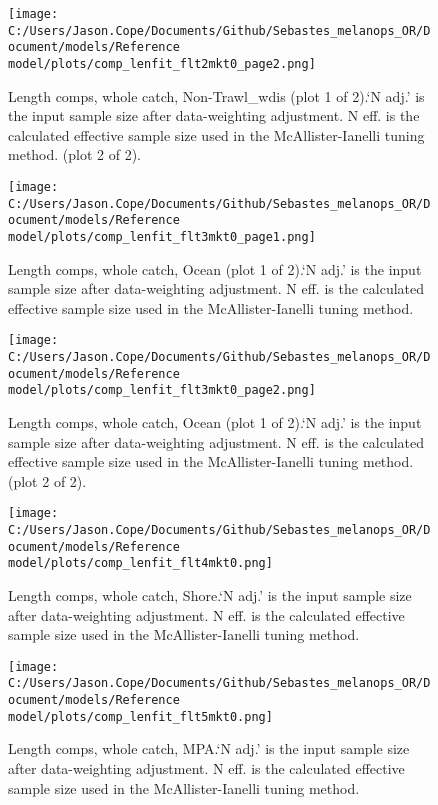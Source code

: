 \documentclass[11pt,
  english,
  letterpaper,
]{article}
\begin{document}
\begin{figure}
\centering
\texttt{[image: C:/Users/Jason.Cope/Documents/Github/Sebastes\_melanops\_OR/Document/models/Reference model/plots/comp\_lenfit\_flt2mkt0\_page2.png]}
\caption{Length comps, whole catch, Non-Trawl\_wdis (plot 1 of 2).`N adj.' is the input sample size after data-weighting adjustment. N eff. is the calculated effective sample size used in the McAllister-Ianelli tuning method. (plot 2 of 2).\label{fig:comp_lenfit_flt2mkt0_page2}}
\end{figure}

\begin{figure}
\centering
\texttt{[image: C:/Users/Jason.Cope/Documents/Github/Sebastes\_melanops\_OR/Document/models/Reference model/plots/comp\_lenfit\_flt3mkt0\_page1.png]}
\caption{Length comps, whole catch, Ocean (plot 1 of 2).`N adj.' is the input sample size after data-weighting adjustment. N eff. is the calculated effective sample size used in the McAllister-Ianelli tuning method.\label{fig:comp_lenfit_flt3mkt0_page1}}
\end{figure}

\begin{figure}
\centering
\texttt{[image: C:/Users/Jason.Cope/Documents/Github/Sebastes\_melanops\_OR/Document/models/Reference model/plots/comp\_lenfit\_flt3mkt0\_page2.png]}
\caption{Length comps, whole catch, Ocean (plot 1 of 2).`N adj.' is the input sample size after data-weighting adjustment. N eff. is the calculated effective sample size used in the McAllister-Ianelli tuning method. (plot 2 of 2).\label{fig:comp_lenfit_flt3mkt0_page2}}
\end{figure}

\begin{figure}
\centering
\texttt{[image: C:/Users/Jason.Cope/Documents/Github/Sebastes\_melanops\_OR/Document/models/Reference model/plots/comp\_lenfit\_flt4mkt0.png]}
\caption{Length comps, whole catch, Shore.`N adj.' is the input sample size after data-weighting adjustment. N eff. is the calculated effective sample size used in the McAllister-Ianelli tuning method.\label{fig:comp_lenfit_flt4mkt0}}
\end{figure}

\begin{figure}
\centering
\texttt{[image: C:/Users/Jason.Cope/Documents/Github/Sebastes\_melanops\_OR/Document/models/Reference model/plots/comp\_lenfit\_flt5mkt0.png]}
\caption{Length comps, whole catch, MPA.`N adj.' is the input sample size after data-weighting adjustment. N eff. is the calculated effective sample size used in the McAllister-Ianelli tuning method.\label{fig:comp_lenfit_flt5mkt0}}
\end{figure}
\end{document}
